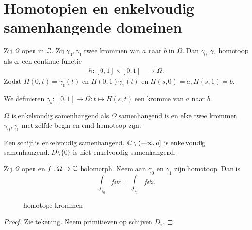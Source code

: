 
\section{Homotopien en enkelvoudig samenhangende domeinen} \label{sec:homotopien_en_enkelvoudig_samenhangende_domeinen}
\begin{definitie}
	[homotopie]
	Zij $\Omega$ open in $\mathbb{C}$. 
	Zij $\gamma_0, \gamma_1$ twee krommen van $a$ naar $b$ in $\Omega$. 
	Dan $\gamma_0, \gamma_1$ homotoop als er een continue functie  \begin{align*}
		h: [0,1] \times [0,1] &\longrightarrow \Omega 
	.\end{align*}
	Zodat $H(0, t) = \gamma_0(t)$ en $H(0, 1) \gamma_1(t)$ en $H(s, 0) = a, H(s, 1) = b$. 
\end{definitie}
We definieren $\gamma_s: [0, 1] \to \Omega: t\mapsto H(s, t)$ een kromme van $a$ naar $b$.

\begin{definitie}
	$\Omega$ is enkelvoudig samenhangend als $\Omega$ samenhangend is en elke twee krommen $\gamma_0, \gamma_1 $ met zelfde begin en eind homotoop zijn.
\end{definitie}
\begin{vb}
	Een schijf is enkelvoudig samenhangend. 
	$\mathbb{C} \setminus (-\infty, o] $ is enkelvoudig samenhangend. 
	$D \setminus \{0\} $ is niet enkelvoudig samenhangend.
\end{vb}

\begin{stelling}
	Zij $\Omega$ open en $f: \Omega \to \mathbb{C}$ holomorph. 
	Neem aan $\gamma_0$ en $\gamma_1$ zijn homotoop. 
	Dan is \[
	\int_{\gamma_0}^{} f \dd z = \int_{\gamma_1}^{}  f \dd z  
	.\] 
\end{stelling}

\begin{figure}[ht]
    \centering
    \caption{homotope krommen}
    \label{fig:homotope-krommen}
\end{figure}
\begin{proof}
Zie tekening. Neem primitieven op schijven $D_i$. 
\end{proof}

